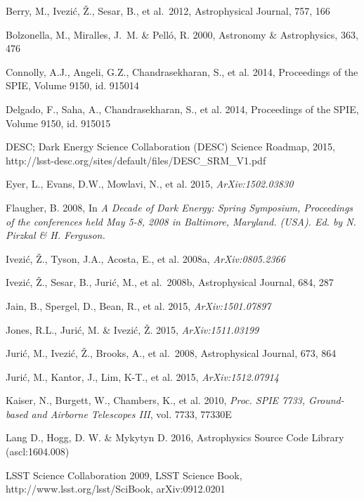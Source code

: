 \documentclass{iau}
\begin{document}
\begin{thebibliography}{}
\bibitem[()]{} Berry, M., Ivezi\'c, \v Z., Sesar, B., et al.~2012, Astrophysical Journal, 757, 166

\bibitem[()]{} Bolzonella, M., Miralles, J.~M. \& Pell\'{o}, R. 2000, Astronomy \& Astrophysics, 363, 476

\bibitem[()]{} Connolly, A.J., Angeli, G.Z., Chandrasekharan, S., et al. 2014, Proceedings of the SPIE, 
          Volume 9150, id. 915014

\bibitem[()]{} Delgado, F., Saha, A., Chandrasekharan, S., et al. 2014, Proceedings of the SPIE, Volume 9150, 
          id. 915015

\bibitem[()]{} DESC; Dark Energy Science Collaboration (DESC) Science
  Roadmap, 2015, http://lsst-desc.org/sites/default/files/DESC_SRM_V1.pdf


\bibitem[()]{} Eyer, L., Evans, D.W., Mowlavi, N., et al. 2015, \textit{{\rm ArXiv:}1502.03830}

{Flaugher, B. 2008}, In \textit{A Decade of Dark Energy: Spring Symposium, Proceedings of
  the conferences held May 5-8, 2008 in Baltimore, Maryland. (USA). Ed. by N. Pirzkal \& H. Ferguson.}

 {Ivezi{\'c}, {\v Z}., Tyson, J.A., Acosta, E., et al. 2008a}, \textit{{\rm ArXiv:}0805.2366}

\bibitem[()]{} Ivezi\'c, \v Z., Sesar, B., Juri\'{c}, M., et al.~2008b, Astrophysical Journal, 684, 287

\bibitem[()]{} Jain, B., Spergel, D., Bean, R., et al. 2015, \textit{{\rm ArXiv:}1501.07897}

\bibitem[()]{} Jones, R.L., Juri\'{c}, M. \& Ivezi\'c, \v Z. 2015, \textit{{\rm ArXiv:}1511.03199}

\bibitem[()]{} Juri\'{c}, M., Ivezi\'c, \v Z., Brooks, A., et al.~2008, Astrophysical Journal, 673, 864

\bibitem[()]{} Juri\'{c}, M., Kantor, J., Lim, K-T., et al. 2015, \textit{{\rm ArXiv:}1512.07914}

{Kaiser, N., Burgett, W., Chambers, K., et al. 2010}, 
\textit{Proc. SPIE 7733, Ground-based and Airborne Telescopes III}, vol. 7733, 77330E

\bibitem[()]{} Lang D., Hogg, D. W. \& Mykytyn D. 2016, Astrophysics Source Code Library (ascl:1604.008)

{LSST Science Collaboration 2009}, 
LSST Science Book, http://www.lsst.org/lsst/SciBook, arXiv:0912.0201


\end{thebibliography}
\end{document}
